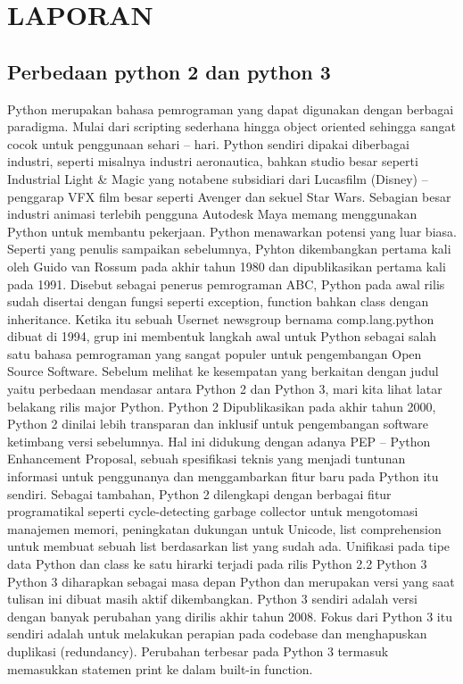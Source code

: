 \chapter*{LAPORAN}

\section{Perbedaan python 2 dan python 3 }
\par

Python merupakan bahasa pemrograman yang dapat digunakan dengan berbagai paradigma. Mulai dari scripting sederhana hingga object oriented sehingga sangat cocok untuk penggunaan sehari – hari. Python sendiri dipakai diberbagai industri, seperti misalnya industri aeronautica, bahkan studio besar seperti Industrial Light & Magic yang notabene subsidiari dari Lucasfilm (Disney) – penggarap VFX film besar seperti Avenger dan sekuel Star Wars. Sebagian besar industri animasi terlebih pengguna Autodesk Maya memang menggunakan Python untuk membantu pekerjaan. Python menawarkan potensi yang luar biasa.
Seperti yang penulis sampaikan sebelumnya, Pyhton dikembangkan pertama kali oleh Guido van Rossum pada akhir tahun 1980 dan dipublikasikan pertama kali pada 1991. Disebut sebagai penerus pemrograman ABC, Python pada awal rilis sudah disertai dengan fungsi seperti exception, function bahkan class dengan inheritance. Ketika itu sebuah Usernet newsgroup bernama comp.lang.python dibuat di 1994, grup ini membentuk langkah awal untuk Python sebagai salah satu bahasa pemrograman yang sangat populer untuk pengembangan Open Source Software.
Sebelum melihat ke kesempatan yang berkaitan dengan judul yaitu perbedaan mendasar antara Python 2 dan Python 3, mari kita lihat latar belakang rilis major Python.
Python 2
Dipublikasikan pada akhir tahun 2000, Python 2 dinilai lebih transparan dan inklusif untuk pengembangan software ketimbang versi sebelumnya. Hal ini didukung dengan adanya PEP – Python Enhancement Proposal, sebuah spesifikasi teknis yang menjadi tuntunan informasi untuk penggunanya dan menggambarkan fitur baru pada Python itu sendiri.
Sebagai tambahan, Python 2 dilengkapi dengan berbagai fitur programatikal seperti cycle-detecting garbage collector untuk mengotomasi manajemen memori, peningkatan dukungan untuk Unicode, list comprehension untuk membuat sebuah list berdasarkan list yang sudah ada. Unifikasi pada tipe data Python dan class ke satu hirarki terjadi pada rilis Python 2.2
Python 3
Python 3 diharapkan sebagai masa depan Python dan merupakan versi yang saat tulisan ini dibuat masih aktif dikembangkan. Python 3 sendiri adalah versi dengan banyak perubahan yang dirilis akhir tahun 2008. Fokus dari Python 3 itu sendiri adalah untuk melakukan perapian pada codebase dan menghapuskan duplikasi (redundancy). Perubahan terbesar pada Python 3 termasuk memasukkan statemen print ke dalam built-in function.

